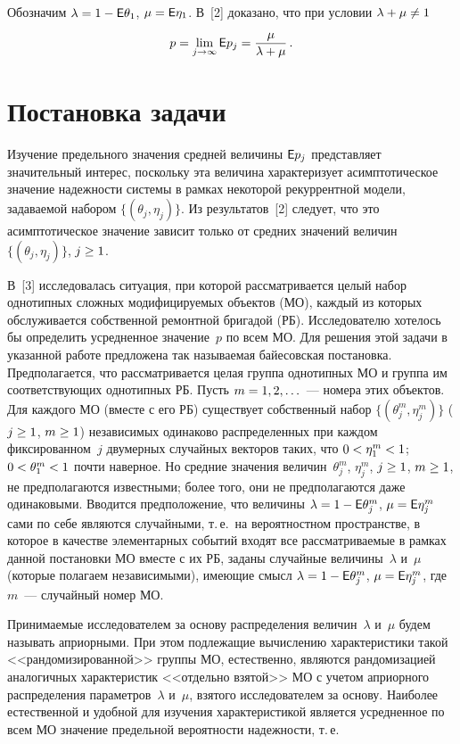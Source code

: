 \begin{multicols}{2}
Обозначим $\lambda = 1 \hm- {\sf E}\theta_1$, $\mu \hm = {\sf E}\eta_1$.
В~[2] доказано, что при условии $\lambda\hm+\mu\hm\neq1$
$$
p=\lim\limits_{j\to\infty}{\sf E} p_j = \displaystyle\frac{\displaystyle \mu\mathstrut}{\displaystyle \lambda+\mu\mathstrut}\,.
$$

\section{Постановка задачи}

Изучение предельного значения  средней величины ${\sf E} p_j$
представляет значительный интерес, посколь\-ку эта величина
характеризует асимптотическое значение надежности системы в рамках
некоторой рекуррентной модели, задаваемой набором $\{(\theta_j,
\eta_j)\}$. Из результатов~[2] следует, что это асимптотическое
значение зависит только от средних значений величин $\{(\theta_j,
\eta_j)\}$, $j\hm\ge1$.

В~[3] исследовалась ситуация,  при которой рассматривается целый
набор однотипных сложных модифицируемых объектов (МО), каждый из
которых обслуживается собственной ремонтной бригадой (РБ).
Исследователю хотелось бы определить усредненное значение~$p$ по
всем МО. Для решения этой задачи  в указанной работе предложена так
называемая байесовская постановка. Предполагается, что
рассматривается целая группа однотипных МО и группа им
соответствующих однотипных РБ. Пусть $m\hm=1,2,\ldots$~--- номера этих
объектов. Для каждого МО (вместе с его РБ) существует собственный
набор $\{(\theta_j^m, \eta_j^m)\}$ ($j\hm\ge1$, $m\hm\ge1$) независимых
одинаково распределенных при каждом фиксированном~$j$ двумерных
случайных векторов таких, что $0 \hm< \eta_1^m \hm< 1$; $0 \hm< \theta_1^m \hm< 1$
почти наверное. Но средние значения величин~$\theta_j^m$,
$\eta_j^m$, $j\hm\ge1$, $m\hm\ge1$, не предполагаются известными; более
того, они не предполагаются даже одинаковыми. Вводится
предположение, что величины $\lambda \hm= 1 \hm- {\sf E}\theta_j^m$, $\mu\hm =
{\sf E}\eta_j^m$ сами по себе являются случайными, т.\,е.\ на
вероятностном пространстве, в которое в качестве элементарных
событий входят все рас\-смат\-ри\-ва\-емые в рамках данной постановки МО
вместе с их РБ, заданы случайные величины~$\lambda$ и~$\mu$ (которые
 полагаем независимыми), имеющие смысл $\lambda \hm= 1 \hm-
{\sf E}\theta_j^m$, $\mu \hm= {\sf E}\eta_j^m$, где $m$~--- случайный номер МО.

Принимаемые исследователем за основу распределения величин~$\lambda$
и~$\mu$ будем называть априорными.
%
При этом подлежащие  вычислению характеристики такой
<<рандомизированной>> группы МО, естественно, являются рандомизацией
аналогичных характеристик <<отдельно взятой>> МО с учетом априорного
распределения параметров~$\lambda$ и~$\mu$, взятого исследователем
за основу. Наиболее естественной и удобной для изучения
характеристикой является усредненное по всем МО значение предельной
вероятности надежности, т.\,е.\


\end{multicols}
